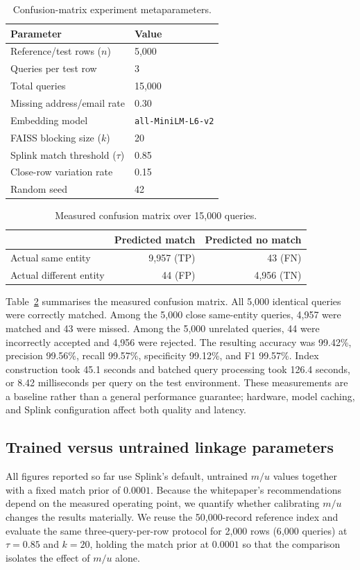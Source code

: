 \documentclass[conference]{IEEEtran}
\begin{document}
\begin{table}[h]
\centering
\caption{Confusion-matrix experiment metaparameters.}
\label{tab:confusion-metaparameters}
\begin{tabular}{ll}
\toprule
Parameter & Value \\
\midrule
Reference/test rows ($n$) & 5,000 \\
Queries per test row & 3 \\
Total queries & 15,000 \\
Missing address/email rate & 0.30 \\
Embedding model & \texttt{all-MiniLM-L6-v2} \\
FAISS blocking size ($k$) & 20 \\
Splink match threshold ($\tau$) & 0.85 \\
Close-row variation rate & 0.15 \\
Random seed & 42 \\
\bottomrule
\end{tabular}
\end{table}

\begin{table}[h]
\centering
\caption{Measured confusion matrix over 15,000 queries.}
\label{tab:confusion-matrix}
\begin{tabular}{lrr}
\toprule
 & Predicted match & Predicted no match \\
\midrule
Actual same entity & 9,957 (TP) & 43 (FN) \\
Actual different entity & 44 (FP) & 4,956 (TN) \\
\bottomrule
\end{tabular}
\end{table}

Table~\ref{tab:confusion-matrix} summarises the measured confusion matrix. All 5,000 identical queries were correctly matched. Among the 5,000 close same-entity queries, 4,957 were matched and 43 were missed. Among the 5,000 unrelated queries, 44 were incorrectly accepted and 4,956 were rejected. The resulting accuracy was 99.42\%, precision 99.56\%, recall 99.57\%, specificity 99.12\%, and F1 99.57\%. Index construction took 45.1 seconds and batched query processing took 126.4 seconds, or 8.42 milliseconds per query on the test environment. These measurements are a baseline rather than a general performance guarantee; hardware, model caching, and Splink configuration affect both quality and latency.

\subsection{Trained versus untrained linkage parameters}
All figures reported so far use Splink's default, untrained $m/u$ values together with a fixed match prior of $0.0001$. Because the whitepaper's recommendations depend on the measured operating point, we quantify whether calibrating $m/u$ changes the results materially. We reuse the 50{,}000-record reference index and evaluate the same three-query-per-row protocol for 2{,}000 rows (6{,}000 queries) at $\tau=0.85$ and $k=20$, holding the match prior at $0.0001$ so that the comparison isolates the effect of $m/u$ alone.
\end{document}
